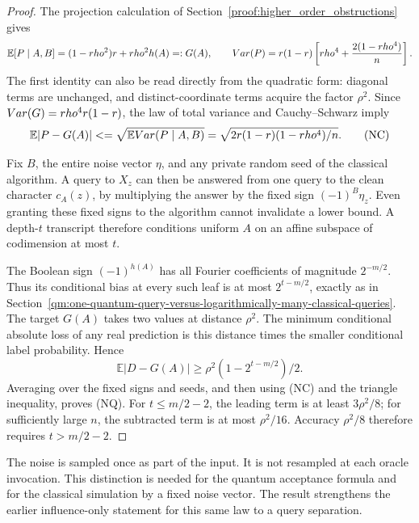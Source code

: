 \begin{proof}
The projection calculation of Section~\ref{proof:higher_order_obstructions}
gives
\[
 \mathbb E[P\mid A,B]=(1-rho^2)r+rho^2h(A)=:G(A),
 \qquad
 Var(P)=r(1-r)\left[rho^4+\frac{2(1-rho^4)}n\right].
\]
The first identity can also be read directly from the quadratic form:
diagonal terms are unchanged, and distinct-coordinate terms acquire
the factor $\rho^2$.  Since $Var(G)=rho^4r(1-r)$, the law of total
variance and Cauchy--Schwarz imply
\[
 \mathbb E|P-G(A)|
 <=\sqrt{\mathbb EVar(P\mid A,B)}
 =\sqrt{2r(1-r)(1-rho^4)/n}.
 \tag{NC}
\]

Fix $B$, the entire noise vector $\eta$, and any private random seed of
the classical algorithm.  A query to $X_z$ can then be answered from
one query to the clean character $c_A(z)$, by multiplying the answer by
the fixed sign $(-1)^B\eta_z$.  Even granting these fixed signs to the
algorithm cannot invalidate a lower bound.  A depth-$t$ transcript
therefore conditions uniform $A$ on an affine subspace of codimension
at most $t$.

The Boolean sign $(-1)^{h(A)}$ has all Fourier coefficients of magnitude
$2^{-m/2}$.  Thus its conditional bias at every such leaf is at most
$2^{t-m/2}$, exactly as in
Section~\ref{qm:one-quantum-query-versus-logarithmically-many-classical-queries}.
The target $G(A)$ takes two values at distance $\rho^2$.  The minimum
conditional absolute loss of any real prediction is this distance
times the smaller conditional label probability.  Hence
\[
 \mathbb E|D-G(A)|\ge
 \rho^2(1-2^{t-m/2})/2.
\]
Averaging over the fixed signs and seeds, and then using (NC) and the
triangle inequality, proves (NQ).  For $t\le m/2-2$, the leading term
is at least $3\rho^2/8$; for sufficiently large $n$, the subtracted
term is at most $\rho^2/16$.  Accuracy $\rho^2/8$ therefore requires
$t>m/2-2$.
\end{proof}

The noise is sampled once as part of the input.  It is not resampled
at each oracle invocation.  This distinction is needed for the quantum
acceptance formula and for the classical simulation by a fixed noise
vector.  The result strengthens the earlier influence-only statement
for this same law to a query separation.
